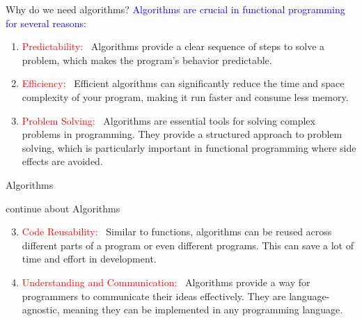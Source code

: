 \documentclass{beamer}\usepackage[]{graphicx}\usepackage[]{xcolor}
\begin{document}

\begin{frame}{Why do we need algorithms?}
    \textcolor{blue}{ Algorithms are crucial in functional programming for several reasons:}
    \begin{block}
       
\begin{enumerate}
    

\item \textcolor{red}{Predictability:}~ Algorithms provide a clear sequence of steps to solve a problem, which makes the program's behavior predictable.

\item \textcolor{red}{Efficiency:}~ Efficient algorithms can significantly reduce the time and space complexity of your program, making it run faster and consume less memory.

\item \textcolor{red}{Problem Solving:}~ Algorithms are essential tools for solving complex problems in programming. They provide a structured approach to problem solving, which is particularly important in functional programming where side effects are avoided.

\end{enumerate}

\end{block}
\end{frame}


\begin{frame}{Algorithms}
\begin{block}{continue about Algorithms}
    \begin{enumerate}
        \setcounter{enumi}{2}

\item \textcolor{red}{Code Reusability:}~ Similar to functions, algorithms can be reused across different parts of a program or even different programs. This can save a lot of time and effort in development.

\item \textcolor{red}{Understanding and Communication:}~ Algorithms provide a way for programmers to communicate their ideas effectively. They are language-agnostic, meaning they can be implemented in any programming language.

    \end{enumerate}
\end{block}
\end{frame}
\end{document}
